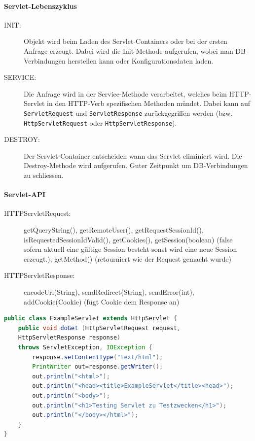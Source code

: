\paragraph{Servlet-Lebenszyklus}
\begin{description}
	\item[INIT:] Objekt wird beim Laden des Servlet-Containers oder bei der ersten Anfrage erzeugt. Dabei wird die Init-Methode aufgerufen, wobei man DB-Verbindungen herstellen kann oder Konfigurationsdaten laden.
	\item[SERVICE:] Die Anfrage wird in der Service-Methode verarbeitet, welches beim HTTP-Servlet in den HTTP-Verb spezifischen Methoden mündet. Dabei kann auf \verb|ServletRequest| und \verb|ServletResponse| zurückgegriffen werden (bzw. \verb|HttpServletRequest| oder \verb|HttpServletResponse|).
	\item[DESTROY:] Der Servlet-Container entscheiden wann das Servlet eliminiert wird. Die Destroy-Methode wird aufgerufen. Guter Zeitpunkt um DB-Verbindungen zu schliessen.
\end{description}

\paragraph{Servlet-API}
\begin{description}
	\item[HTTPServletRequest:] getQueryString(), getRemoteUser(), getRequestSessionId(), isRequestedSessionIdValid(), getCookies(), getSession(boolean) (false sofern aktuell eine gültige Session besteht sonst wird eine neue Session erzeugt.),  getMethod() (retourniert wie der Request gemacht wurde)
	\item[HTTPServletResponse:]	encodeUrl(String), sendRedirect(String), sendError(int), addCookie(Cookie) (fügt Cookie dem Response an)
\end{description}

\begin{lstlisting}[language=Java, caption=Servlet Sample]
public class ExampleServlet extends HttpServlet {
	public void doGet (HttpServletRequest request,
	HttpServletResponse response)
	throws ServletException, IOException {
		response.setContentType("text/html");
		PrintWriter out=response.getWriter();
		out.println("<html>");
		out.println("<head><title>ExampleServlet</title><head>");
		out.println("<body>");
		out.println("<h1>Testing Servlet zu Testzwecken</h1>");
		out.println("</body></html>");
	}
}
\end{lstlisting}

